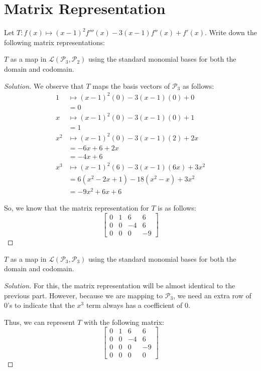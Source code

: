 \documentclass{article}
\newenvironment{solution}{\begin{proof}[Solution]}{\end{proof}}
\begin{document}
	\newpage
	
	\section{Matrix Representation}
	Let $T: f(x) \mapsto (x-1)^{2}f'''(x) - 3(x-1)f''(x) +f'(x)$. Write down the following matrix representations:
	\begin{hw}
		$T$ as a map in $\mathcal L(\mathscr{P}_{3}, \mathscr{P}_{2})$ using the standard monomial bases for both the domain and codomain.
	\end{hw}
	\begin{solution}
		We observe that $T$ maps the basis vectors of $\mathscr{P}_{3}$ as follows:
		\begin{align*}
			1 &\mapsto (x-1)^{2}(0) - 3(x-1)(0) + 0 \\
			&= 0 \\
			x &\mapsto (x-1)^{2}(0) - 3(x-1)(0) + 1 \\
			&= 1 \\
			x^{2} &\mapsto (x-1)^{2}(0) - 3(x-1)(2) + 2x \\
			&= -6x + 6 + 2x \\
			&= -4x + 6 \\
			x^{3} &\mapsto (x-1)^{2}(6) - 3(x-1)(6x) + 3x^{2} \\
			&= 6(x^{2} - 2x + 1) - 18(x^{2} - x) + 3x^{2} \\
			&= -9x^{2} + 6x + 6
		\end{align*}
	
		So, we know that the matrix representation for $T$ is as follows:
		\begin{equation*}
			\begin{bmatrix}
				0 & 1 & 6 & 6 \\
				0 & 0 & -4 & 6 \\
				0 & 0 & 0 & -9
			\end{bmatrix}
		\end{equation*}
	\end{solution}

	\begin{hw}
		$T$ as a map in $\mathcal L(\mathscr{P}_{3}, \mathscr{P}_{3})$ using the standard monomial bases for both the domain and codomain.
	\end{hw}
	\begin{solution}
		For this, the matrix representation will be almost identical to the previous part. However, because we are mapping to $\mathscr{P}_{3}$, we need an extra row of 0's to indicate that the $x^{3}$ term always has a coefficient of 0.
		
		Thus, we can represent $T$ with the following matrix:
		\begin{equation*}
			\begin{bmatrix}
				0 & 1 & 6 & 6 \\
				0 & 0 & -4 & 6 \\
				0 & 0 & 0 & -9 \\
				0 & 0 & 0 & 0
			\end{bmatrix}
		\end{equation*}
	\end{solution}
	
\end{document}
